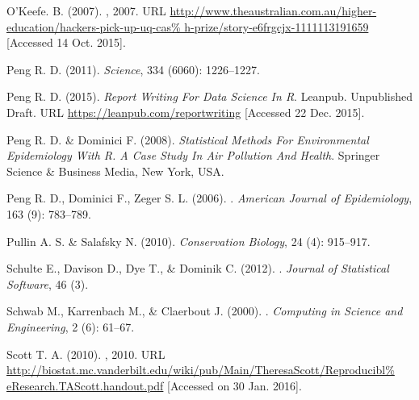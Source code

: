 \documentclass[11pt,a4paper]{article}
\begin{document}
\begin{thebibliography}{30}
O'Keefe. B. (2007).
, 2007.
\newblock URL
  \url{http://www.theaustralian.com.au/higher-education/hackers-pick-up-uq-cas%
h-prize/story-e6frgcjx-1111113191659} [Accessed 14 Oct. 2015].

Peng R. D. (2011).
\newblock \emph{Science}, 334 (6060): 1226--1227.

Peng R. D. (2015).
\newblock \emph{{Report Writing For Data Science In R}}.
\newblock Leanpub. Unpublished Draft.
\newblock URL \url{https://leanpub.com/reportwriting} [Accessed 22 Dec. 2015].

Peng R. D. \& Dominici F. (2008).
\newblock \emph{{Statistical Methods For Environmental Epidemiology With R. A
  Case Study In Air Pollution And Health}}.
\newblock Springer Science {\&} Business Media, New York, USA.

Peng R. D., Dominici F., Zeger S. L. (2006).
.
\newblock \emph{American Journal of Epidemiology}, 163 (9):
  783--789.

Pullin A. S.  \& Salafsky N.   (2010).
\newblock \emph{Conservation Biology}, 24 (4): 915--917.


Schulte E., Davison D., Dye T., \& Dominik C. (2012).
.
\newblock \emph{Journal of Statistical Software}, 46 (3).

Schwab M., Karrenbach M., \& Claerbout J. (2000).
.
\newblock \emph{Computing in Science and Engineering}, 2 (6):
  61--67.


Scott T. A. (2010).
, 2010.
\newblock URL
  \url{http://biostat.mc.vanderbilt.edu/wiki/pub/Main/TheresaScott/Reproducibl%
eResearch.TAScott.handout.pdf} [Accessed on 30 Jan. 2016].


\end{thebibliography}
\end{document}
